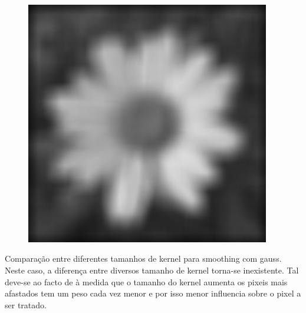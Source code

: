\documentclass[a4paper]{report}
\begin{document}
\begin{figure}[H]
\begin{minipage}{.3\textwidth}
\end{minipage}%
\begin{minipage}{.3\textwidth}
  \centering
  \includegraphics[width=0.95\textwidth]{images/Smooth/spatial-salt-n-pepper/flower_smooth_spatial_average_20_0.8.png}
\end{minipage}
\end{figure}

Comparação entre diferentes tamanhos de kernel para smoothing com gauss. Neste caso, a diferença entre diversos tamanho
de kernel torna-se inexistente. Tal deve-se ao facto de à medida que o tamanho do kernel aumenta os pixeis mais afastados
tem um peso cada vez menor e por isso menor influencia sobre o pixel a ser tratado.
\end{document}
